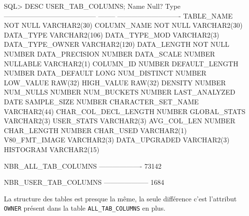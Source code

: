 \documentclass[•]{article}
\begin{document}
\begin{sql}
SQL> DESC USER_TAB_COLUMNS;
 Name                                      Null?    Type
 ----------------------------------------- -------- ----------------------------
 TABLE_NAME                                NOT NULL VARCHAR2(30)
 COLUMN_NAME                               NOT NULL VARCHAR2(30)
 DATA_TYPE                                          VARCHAR2(106)
 DATA_TYPE_MOD                                      VARCHAR2(3)
 DATA_TYPE_OWNER                                    VARCHAR2(120)
 DATA_LENGTH                               NOT NULL NUMBER
 DATA_PRECISION                                     NUMBER
 DATA_SCALE                                         NUMBER
 NULLABLE                                           VARCHAR2(1)
 COLUMN_ID                                          NUMBER
 DEFAULT_LENGTH                                     NUMBER
 DATA_DEFAULT                                       LONG
 NUM_DISTINCT                                       NUMBER
 LOW_VALUE                                          RAW(32)
 HIGH_VALUE                                         RAW(32)
 DENSITY                                            NUMBER
 NUM_NULLS                                          NUMBER
 NUM_BUCKETS                                        NUMBER
 LAST_ANALYZED                                      DATE
 SAMPLE_SIZE                                        NUMBER
 CHARACTER_SET_NAME                                 VARCHAR2(44)
 CHAR_COL_DECL_LENGTH                               NUMBER
 GLOBAL_STATS                                       VARCHAR2(3)
 USER_STATS                                         VARCHAR2(3)
 AVG_COL_LEN                                        NUMBER
 CHAR_LENGTH                                        NUMBER
 CHAR_USED                                          VARCHAR2(1)
 V80_FMT_IMAGE                                      VARCHAR2(3)
 DATA_UPGRADED                                      VARCHAR2(3)
 HISTOGRAM                                          VARCHAR2(15)



NBR_ALL_TAB_COLUMNS                                                             
-------------------                                                             
              73142

NBR_USER_TAB_COLUMNS                                                            
--------------------                                                            
                1684
\end{sql}
La structure des tables est presque la même, la seule différence c'est l'attribut \texttt{OWNER} présent dans la table \texttt{ALL\_TAB\_COLUMNS} en plus.
\end{document}
